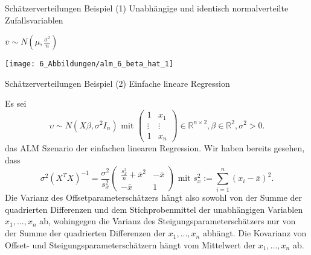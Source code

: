 \documentclass[
  8pt,
  ignorenonframetext,
]{beamer}
\begin{document}
\begin{frame}{Schätzerverteilungen}
\protect\hypertarget{schuxe4tzerverteilungen}{}
Beispiel (1) Unabhängige und identisch normalverteilte Zufallsvariablen
\vspace{3mm} \center

\(\bar{\upsilon} \sim N\left(\mu,\frac{\sigma^2}{n}\right)\)
\vspace{-2mm}

\begin{center}\texttt{[image: 6\_Abbildungen/alm\_6\_beta\_hat\_1]} \end{center}
\vfill
\end{frame}

\begin{frame}{Schätzerverteilungen}
\protect\hypertarget{schuxe4tzerverteilungen-1}{}
Beispiel (2) Einfache lineare Regression \vspace{1mm}

\small

Es sei \begin{equation}
\upsilon \sim N(X\beta, \sigma^2I_n) \mbox{ mit }
\begin{pmatrix}
1       & x_1       \\
\vdots  & \vdots    \\
1       & x_n
\end{pmatrix}
\in \mathbb{R}^{n\times 2},
\beta
\in \mathbb{R}^2,
\sigma^2 > 0.
\end{equation} das ALM Szenario der einfachen linearen Regression. Wir
haben bereits gesehen, dass \begin{equation}
\sigma^2(X^TX)^{-1}
=
\frac{\sigma^2}{s_x^2}
\begin{pmatrix}
  \frac{s_x^2}{n} + \bar{x}^2
& -\bar{x}
\\
  -\bar{x}
&  1
\end{pmatrix}
\mbox{ mit  }
s_x^2 := \sum_{i=1}^n (x_i - \bar{x})^2.
\end{equation} Die Varianz des Offsetparameterschätzers hängt also
sowohl von der Summe der quadrierten Differenzen und dem
Stichprobenmittel der unabhängigen Variablen \(x_1,...,x_n\) ab,
wohingegen die Varianz des Steigungsparameterschätzers nur von der Summe
der quadrierten Differenzen der \(x_1,...,x_n\) abhängt. Die Kovarianz
von Offset- und Steigungsparameterschätzern hängt vom Mittelwert der
\(x_1,...,x_n\) ab.
\end{frame}
\end{document}
